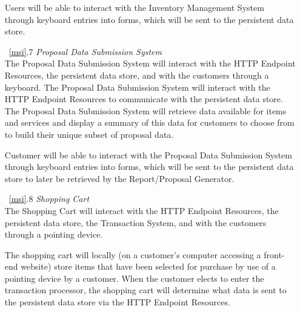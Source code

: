 \documentclass{article}
\newcommand{\br}{\vspace{2mm}}
\begin{document}
\begin{enumerate}
        Users will be able to interact with the Inventory Management System
        through keyboard entries into forms, which will be sent to the
        persistent data store.
    \item[~\ref{msi}.7 ] \emph{Proposal Data Submission System}\br\\
        The Proposal Data Submission System will interact with the HTTP Endpoint
        Resources, the persistent data store, and with the customers through a
        keyboard.  The Proposal Data Submission System will interact with the HTTP
        Endpoint Resources to communicate with the persistent data store.  The
        Proposal Data Submission System will retrieve data available for items and
        services and display a summary of this data for customers to choose from
        to build their unique subset of proposal data.

        Customer will be able to interact with the Proposal Data Submission
        System through keyboard entries into forms, which will be sent to the
        persistent data store to later be retrieved by the Report/Proposal
        Generator.
    \item[~\ref{msi}.8 ] \emph{Shopping Cart}\br\\
        The Shopping Cart will interact with the HTTP Endpoint
        Resources, the persistent data store, the Transaction System, and with
        the customers through a pointing device.

        The shopping cart will locally (on a customer's computer accessing a
        front-end website) store items that have been selected for
        purchase by use of a pointing device by a customer.  When the customer
        elects to enter the transaction processor, the shopping cart will determine
        what data is sent to the persistent data store via the HTTP Endpoint
        Resources.
\end{enumerate}

\end{document}
